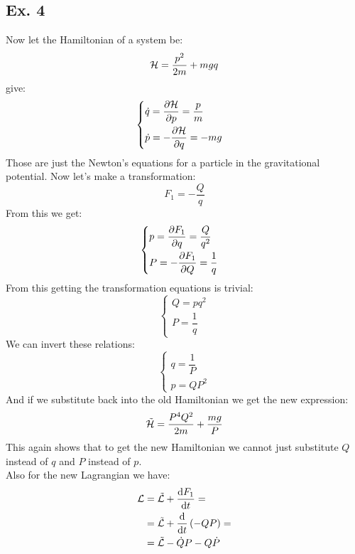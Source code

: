 \subsection{Ex. 4}
Now let the Hamiltonian of a system be:
\begin{equation}
    \mathcal{H} = \dfrac{p^2}{2m} + mgq
\end{equation}
\hamiltonref\;give:
\begin{equation}
    \begin{cases}
        \dot{q} = \dfrac{\partial \mathcal{H}}{\partial p} = \dfrac{p}{m}\\[8pt]
        \dot{p} = -\dfrac{\partial \mathcal{H}}{\partial q} = -mg
    \end{cases}
\end{equation}
Those are just the Newton's equations for a particle in the gravitational potential. Now let's make a transformation:
\begin{equation}
    F_1 = -\dfrac{Q}{q}
\end{equation}
From this we get:
\begin{equation}
    \begin{cases}
        p = \dfrac{\partial F_1}{\partial q} = \dfrac{Q}{q^2}\\[8pt]
        P = -\dfrac{\partial F_1}{\partial Q} = \dfrac{1}{q}
    \end{cases}
\end{equation}
From this getting the transformation equations is trivial:
\begin{equation}
    \begin{cases}
        Q = pq^2\\[8pt]
        P = \dfrac{1}{q}
    \end{cases}
\end{equation}
We can invert these relations:
\begin{equation}
    \begin{cases}
        q = \dfrac{1}{P}\\
        p = QP^2
    \end{cases}
\end{equation}
And if we substitute back into the old Hamiltonian we get the new expression:
\begin{equation}
    \tilde{\mathcal{H}} = \dfrac{P^4 Q^2}{2m} + \dfrac{mg}{P}
\end{equation}
This again shows that to get the new Hamiltonian we cannot just substitute $Q$ instead of $q$ and $P$ instead of $p$.\\
Also for the new Lagrangian we have:
\begin{equation}
    \begin{split}
        \mathcal{L} &= \tilde{\mathcal{L}} + \dfrac{\mathrm{d}F_1 }{\mathrm{d}t} =\\
        &= \tilde{\mathcal{L}} + \dfrac{\mathrm{d} }{\mathrm{d}t}\left(-QP\right) =\\
        &=\tilde{\mathcal{L}} - \dot{Q}P - Q\dot{P}
    \end{split}
\end{equation}
